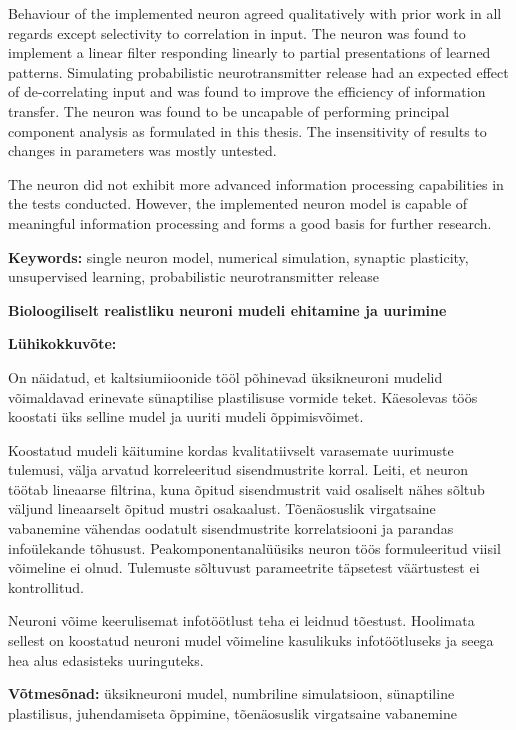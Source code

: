 \documentclass[a4paper,12pt]{report}
\theoremstyle{definition}
\newcommand{\thesistitleEST}{Bioloogiliselt realistliku neuroni mudeli ehitamine ja uurimine}
\begin{document}
Behaviour of the implemented neuron agreed qualitatively with prior work in all regards except selectivity to correlation in input. The neuron was found to implement a linear filter responding linearly to partial presentations of learned patterns. Simulating probabilistic neurotransmitter release had an expected effect of de-correlating input and was found to improve the efficiency of information transfer. The neuron was found to be uncapable of performing principal component analysis as formulated in this thesis. The insensitivity of results to changes in parameters was mostly untested.

The neuron did not exhibit more advanced information processing capabilities in the tests conducted. However, the implemented neuron model is capable of meaningful information processing and forms a good basis for further research. 

\textbf{Keywords:} single neuron model, numerical simulation, synaptic plasticity, unsupervised learning, probabilistic neurotransmitter release

\vspace{0.5cm}


{\textbf
{\Large \thesistitleEST}}

\textbf{Lühikokkuvõte:}

On näidatud, et kaltsiumiioonide tööl põhinevad üksikneuroni mudelid võimaldavad erinevate sünaptilise plastilisuse vormide teket. Käesolevas töös koostati üks selline mudel ja uuriti mudeli õppimisvõimet.

Koostatud mudeli käitumine kordas kvalitatiivselt varasemate uurimuste tulemusi, välja arvatud korreleeritud sisendmustrite korral. Leiti, et neuron töötab lineaarse filtrina, kuna õpitud sisendmustrit vaid osaliselt nähes sõltub väljund lineaarselt õpitud mustri osakaalust. Tõenäosuslik virgatsaine vabanemine vähendas oodatult sisendmustrite korrelatsiooni ja parandas infoülekande tõhusust. Peakomponentanalüüsiks neuron töös formuleeritud viisil võimeline ei olnud. Tulemuste sõltuvust parameetrite täpsetest väärtustest ei kontrollitud.

Neuroni võime keerulisemat infotöötlust teha ei leidnud tõestust. Hoolimata sellest on koostatud neuroni mudel võimeline kasulikuks infotöötluseks ja seega hea alus edasisteks uuringuteks.

\textbf{Võtmesõnad:} üksikneuroni mudel, numbriline simulatsioon, sünaptiline plastilisus, juhendamiseta õppimine, tõenäosuslik virgatsaine vabanemine
\end{document}
